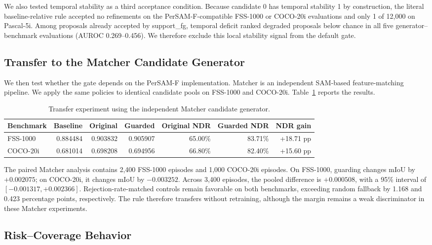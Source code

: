 \documentclass{CVM}
\begin{document}
We also tested temporal stability as a third acceptance condition. Because candidate 0 has temporal stability 1 by construction, the literal baseline-relative rule accepted no refinements on the PerSAM-F-compatible FSS-1000 or COCO-20i evaluations and only 1 of 12,000 on Pascal-5i. Among proposals already accepted by support\_fg, temporal deficit ranked degraded proposals below chance in all five generator--benchmark evaluations (AUROC 0.269--0.456). We therefore exclude this local stability signal from the default gate.

\subsection{Transfer to the Matcher Candidate Generator}

We then test whether the gate depends on the PerSAM-F implementation. Matcher is an independent SAM-based feature-matching pipeline. We apply the same policies to identical candidate pools on FSS-1000 and COCO-20i. Table~\ref{tab:matcher} reports the results.

\begin{table}[h!t]
\center
\caption{Transfer experiment using the independent Matcher candidate generator.}
\begin{tabular}{lrrrrrr}
\toprule
Benchmark & Baseline & Original & Guarded & Original NDR & Guarded NDR & NDR gain \\
\midrule
FSS-1000 & 0.884484 & 0.903832 & 0.905907 & 65.00\% & 83.71\% & +18.71 pp \\
COCO-20i & 0.681014 & 0.698208 & 0.694956 & 66.80\% & 82.40\% & +15.60 pp \\
\bottomrule
\end{tabular}
\label{tab:matcher}
\end{table}

The paired Matcher analysis contains 2,400 FSS-1000 episodes and 1,000 COCO-20i episodes. On FSS-1000, guarding changes mIoU by $+0.002075$; on COCO-20i, it changes mIoU by $-0.003252$. Across 3,400 episodes, the pooled difference is $+0.000508$, with a 95\% interval of $[-0.001317,+0.002366]$. Rejection-rate-matched controls remain favorable on both benchmarks, exceeding random fallback by 1.168 and 0.423 percentage points, respectively. The rule therefore transfers without retraining, although the margin remains a weak discriminator in these Matcher experiments.

\subsection{Risk--Coverage Behavior}
\end{document}
